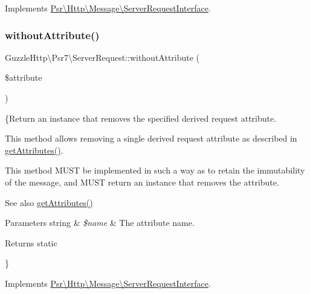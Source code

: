 Implements \hyperlink{interfacePsr_1_1Http_1_1Message_1_1ServerRequestInterface_a5f7d52160bd70abcc43f5b3940dd14eb}{Psr\textbackslash{}\+Http\textbackslash{}\+Message\textbackslash{}\+Server\+Request\+Interface}.

\mbox{\label{classGuzzleHttp_1_1Psr7_1_1ServerRequest_ab1833188a1d67566219f083a6bb33cdf}} 
\subsubsection{\texorpdfstring{without\+Attribute()}{withoutAttribute()}}
{\footnotesize\ttfamily Guzzle\+Http\textbackslash{}\+Psr7\textbackslash{}\+Server\+Request\+::without\+Attribute (\begin{DoxyParamCaption}\item[{}]{\$attribute }\end{DoxyParamCaption})}

\{Return an instance that removes the specified derived request attribute.

This method allows removing a single derived request attribute as described in \hyperlink{interfacePsr_1_1Http_1_1Message_1_1ServerRequestInterface_a0cda25a9b297c86e7813ffcb98ceb3df}{get\+Attributes()}.

This method M\+U\+ST be implemented in such a way as to retain the immutability of the message, and M\+U\+ST return an instance that removes the attribute.

\begin{DoxySeeAlso}{See also}
\hyperlink{interfacePsr_1_1Http_1_1Message_1_1ServerRequestInterface_a0cda25a9b297c86e7813ffcb98ceb3df}{get\+Attributes()} 
\end{DoxySeeAlso}

\begin{DoxyParams}[1]{Parameters}
string & {\em \$name} & The attribute name. \\
\hline
\end{DoxyParams}
\begin{DoxyReturn}{Returns}
static
\end{DoxyReturn}
\} 

Implements \hyperlink{interfacePsr_1_1Http_1_1Message_1_1ServerRequestInterface_a549f6aa6f534896b84b090ae10db23f6}{Psr\textbackslash{}\+Http\textbackslash{}\+Message\textbackslash{}\+Server\+Request\+Interface}.

